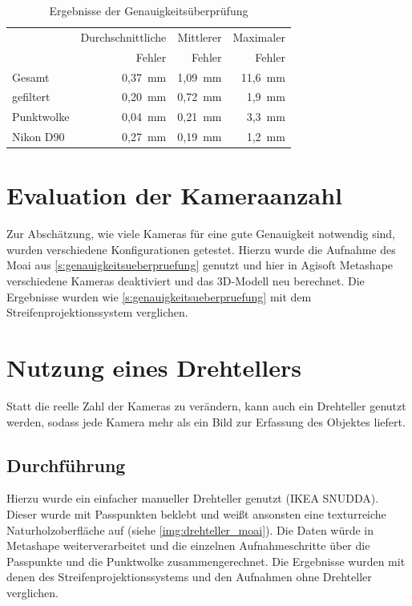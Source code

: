 \documentclass[./00PhotoBox.tex]{subfiles}
\begin{document}
\begin{table}
    \centering
    \caption{Ergebnisse der Genauigkeitsüberprüfung}
    \label{tab:vergleich_erg}
    \begin{tabular}{l|r|r|r}
        \toprule
                   & Durchschnittliche & Mittlerer & Maximaler \\
                   & Fehler            & Fehler    & Fehler    \\
        \midrule
        Gesamt     & 0,37~mm           & 1,09~mm   & 11,6~mm   \\  %
        gefiltert  & 0,20~mm           & 0,72~mm   & 1,9~mm    \\
        \midrule
        Punktwolke & 0,04~mm           & 0,21~mm   & 3,3~mm    \\  %
        \midrule
        Nikon D90  & 0,27~mm           & 0,19~mm   & 1,2~mm    \\
        \bottomrule
    \end{tabular}
\end{table}


\section{Evaluation der Kameraanzahl}
Zur Abschätzung, wie viele Kameras für eine gute Genauigkeit notwendig sind, wurden verschiedene Konfigurationen getestet. Hierzu wurde die Aufnahme des Moai aus \autoref{s:genauigkeitsueberpruefung} genutzt und hier in Agisoft Metashape verschiedene Kameras deaktiviert und das 3D-Modell neu berechnet. Die Ergebnisse wurden wie \autoref{s:genauigkeitsueberpruefung} mit dem Streifenprojektionssystem verglichen.


\section{Nutzung eines Drehtellers}
Statt die reelle Zahl der Kameras zu verändern, kann auch ein Drehteller genutzt werden, sodass jede Kamera mehr als ein Bild zur Erfassung des Objektes liefert.

\subsection{Durchführung}
Hierzu wurde ein einfacher manueller Drehteller genutzt (IKEA SNUDDA). Dieser wurde mit Passpunkten beklebt und weißt ansonsten eine texturreiche Naturholzoberfläche auf (siehe \autoref{img:drehteller_moai}). Die Daten würde in Metashape weiterverarbeitet und die einzelnen Aufnahmeschritte über die Passpunkte und die Punktwolke zusammengerechnet. Die Ergebnisse wurden mit denen des Streifenprojektionssystems und den Aufnahmen ohne Drehteller verglichen.
\end{document}
